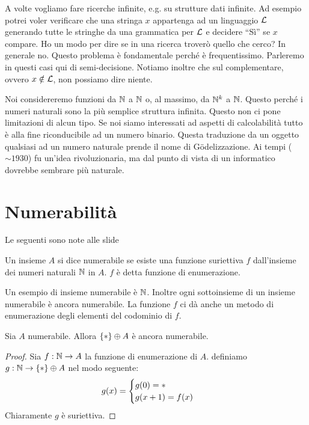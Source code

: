 A volte vogliamo fare ricerche infinite, e.g. su strutture dati infinite. Ad esempio potrei voler
verificare che una stringa $x$ appartenga ad un linguaggio $\mathcal{L}$ generando tutte le stringhe da
una grammatica per $\mathcal{L}$ e decidere ``Sì'' se $x$ compare. Ho un modo per dire se in una ricerca
troverò quello che cerco? In generale no. Questo problema è fondamentale perché è
frequentissimo. Parleremo in questi casi qui di semi-decisione. Notiamo inoltre che sul
complementare, ovvero $x \notin \mathcal{L}$, non possiamo dire niente.

Noi considereremo funzioni da $\mathbb{N}$ a $\mathbb{N}$ o, al massimo, da $\mathbb{N}^{k}$ a $\mathbb{N}$. Questo perché
i numeri naturali sono la più semplice struttura infinita. Questo non ci pone limitazioni di alcun
tipo. Se noi siamo interessati ad aspetti di calcolabilità tutto è alla fine riconducibile ad un
numero binario. Questa traduzione da un oggetto qualsiasi ad un numero naturale prende il nome di
Gödelizzazione. Ai tempi ($\sim 1930$) fu un'idea rivoluzionaria, ma dal punto di vista di un informatico
dovrebbe sembrare più naturale.

\section{Numerabilità}

Le seguenti sono note alle slide

\begin{defn}
    Un insieme $A$ si dice numerabile se esiste una funzione suriettiva $f$ dall'insieme
    dei numeri naturali $\mathbb{N}$ in $A$. $f$ è detta funzione di enumerazione.
\end{defn}

Un esempio di insieme numerabile è $\mathbb{N}$. Inoltre ogni sottoinsieme di un insieme numerabile è
ancora numerabile. La funzione $f$ ci dà anche un metodo di enumerazione degli elementi del
codominio di $f$.

\begin{lem}
   Sia $A$ numerabile. Allora $\{*\} \oplus A$ è ancora numerabile.
\end{lem}
\begin{proof}
    Sia $f : \mathbb{N} \to A$ la funzione di enumerazione di $A$. definiamo $g : \mathbb{N} \to \{*\} \oplus A$
    nel modo seguente:
    \begin{equation*}
        g(x) =
        \begin{cases}
            g(0)=* \quad &\text{}\\
            g(x+1)=f(x) \quad &\text{}\\
        \end{cases}
    \end{equation*}
    Chiaramente $g$ è suriettiva.
\end{proof}

